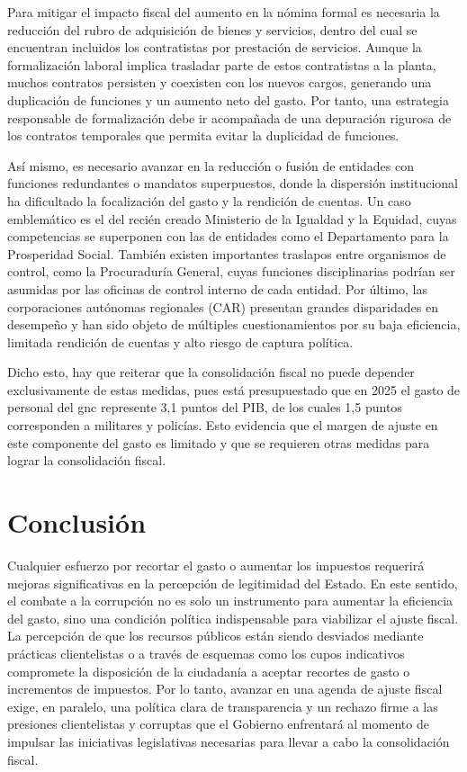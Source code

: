 Para mitigar el impacto fiscal del aumento en la nómina formal es necesaria la reducción del rubro de adquisición de bienes y servicios, dentro del cual se encuentran incluidos los contratistas por prestación de servicios. Aunque la formalización laboral implica trasladar parte de estos contratistas a la planta, muchos contratos persisten y coexisten con los nuevos cargos, generando una duplicación de funciones y un aumento neto del gasto. Por tanto, una estrategia responsable de formalización debe ir acompañada de una depuración rigurosa de los contratos temporales que permita evitar la duplicidad de funciones. 

Así mismo, es necesario avanzar en la reducción o fusión de entidades con funciones redundantes o mandatos superpuestos, donde la dispersión institucional ha dificultado la focalización del gasto y la rendición de cuentas. Un caso emblemático es el del recién creado Ministerio de la Igualdad y la Equidad, cuyas competencias se superponen con las de entidades como el Departamento para la Prosperidad Social. También existen importantes traslapos entre organismos de control, como la Procuraduría General, cuyas funciones disciplinarias podrían ser asumidas por las oficinas de control interno de cada entidad. Por último, las corporaciones autónomas regionales (CAR) presentan grandes disparidades en desempeño y han sido objeto de múltiples cuestionamientos por su baja eficiencia, limitada rendición de cuentas y alto riesgo de captura política. 

Dicho esto, hay que reiterar que la consolidación fiscal no puede depender exclusivamente de estas medidas, pues está presupuestado que en 2025 el gasto de personal del \gls{gnc} represente 3,1 puntos del PIB, de los cuales 1,5 puntos corresponden a militares y policías. Esto evidencia que el margen de ajuste en este componente del gasto es limitado y que se requieren otras medidas para lograr la consolidación fiscal.

\section{Conclusión}

Cualquier esfuerzo por recortar el gasto o aumentar los impuestos requerirá mejoras significativas en la percepción de legitimidad del Estado. En este sentido, el combate a la corrupción no es solo un instrumento para aumentar la eficiencia del gasto, sino una condición política indispensable para viabilizar el ajuste fiscal. La percepción de que los recursos públicos están siendo desviados mediante prácticas clientelistas o a través de esquemas como los cupos indicativos compromete la disposición de la ciudadanía a aceptar recortes de gasto o incrementos de impuestos. Por lo tanto, avanzar en una agenda de ajuste fiscal exige, en paralelo, una política clara de transparencia y un rechazo firme a las presiones clientelistas y corruptas que el Gobierno enfrentará al momento de impulsar las iniciativas legislativas necesarias para llevar a cabo la consolidación fiscal.

